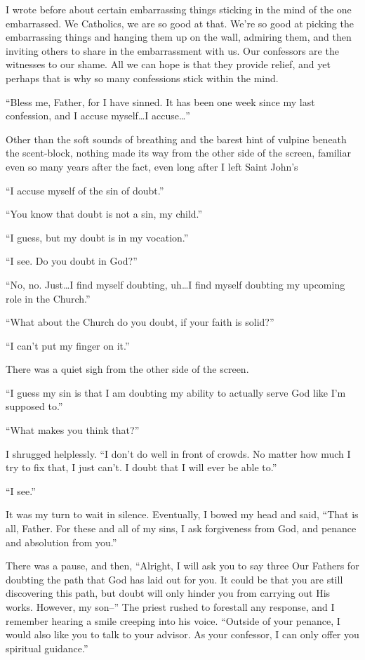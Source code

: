 I wrote before about certain embarrassing things sticking in the mind of the one embarrassed. We Catholics, we are so good at that. We're so good at picking the embarrassing things and hanging them up on the wall, admiring them, and then inviting others to share in the embarrassment with us. Our confessors are the witnesses to our shame. All we can hope is that they provide relief, and yet perhaps that is why so many confessions stick within the mind.

``Bless me, Father, for I have sinned. It has been one week since my last confession, and I accuse myself\ldots I accuse\ldots{}''

Other than the soft sounds of breathing and the barest hint of vulpine beneath the scent-block, nothing made its way from the other side of the screen, familiar even so many years after the fact, even long after I left Saint John's

``I accuse myself of the sin of doubt.''

``You know that doubt is not a sin, my child.''

``I guess, but my doubt is in my vocation.''

``I see. Do you doubt in God?''

``No, no. Just\ldots I find myself doubting, uh\ldots I find myself doubting my upcoming role in the Church.''

``What about the Church do you doubt, if your faith is solid?''

``I can't put my finger on it.''

There was a quiet sigh from the other side of the screen.

``I guess my sin is that I am doubting my ability to actually serve God like I'm supposed to.''

``What makes you think that?''

I shrugged helplessly. ``I don't do well in front of crowds. No matter how much I try to fix that, I just can't. I doubt that I will ever be able to.''

``I see.''

It was my turn to wait in silence. Eventually, I bowed my head and said, ``That is all, Father. For these and all of my sins, I ask forgiveness from God, and penance and absolution from you.''

There was a pause, and then, ``Alright, I will ask you to say three Our Fathers for doubting the path that God has laid out for you. It could be that you are still discovering this path, but doubt will only hinder you from carrying out His works. However, my son--'' The priest rushed to forestall any response, and I remember hearing a smile creeping into his voice. ``Outside of your penance, I would also like you to talk to your advisor. As your confessor, I can only offer you spiritual guidance.''

